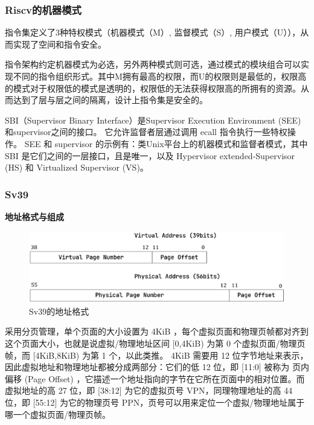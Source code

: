 \subsubsection{Riscv的机器模式}

指令集定义了3种特权模式（机器模式（M）, 监督模式（S）, 用户模式（U）），从而实现了空间和指令安全。

指令架构约定机器模式为必选，另外两种模式则可选，通过模式的模块组合可以实现不同的指令组织形式。其中M拥有最高的权限，而U的权限则是最低的，权限高的模式对于权限低的模式是透明的，权限低的无法获得权限高的所拥有的资源。从而达到了层与层之间的隔离，设计上指令集是安全的。

SBI（Supervisor Binary Interface）是Supervisor Execution Environment (SEE)和supervisor之间的接口。 它允许监督者层通过调用 ecall 指令执行一些特权操作。 SEE 和 supervisor 的示例有：类Unix平台上的机器模式和监督者模式，其中 SBI 是它们之间的一层接口，且是唯一，以及 Hypervisor extended-Supervisor (HS) 和 Virtualized Supervisor (VS)。

\subsubsection{Sv39}

\textbf{地址格式与组成}

\begin{figure}[htb]
    \figureCapSet
    \centering
    \includegraphics[width=.8\linewidth]{figure/c2/addressstructure.png}
    \caption{Sv39的地址格式}
    \label{figure:c2addressstructure}
\end{figure}

采用分页管理，单个页面的大小设置为 4KiB ，每个虚拟页面和物理页帧都对齐到这个页面大小，也就是说虚拟/物理地址区间 [0,4KiB) 为第 0 个虚拟页面/物理页帧，而 [4KiB,8KiB) 为第 1 个，以此类推。 4KiB 需要用 12 位字节地址来表示，因此虚拟地址和物理地址都被分成两部分：它们的低 12 位，即 [11:0] 被称为 页内偏移 (Page Offset) ，它描述一个地址指向的字节在它所在页面中的相对位置。而虚拟地址的高 27 位，即 [38:12] 为它的虚拟页号 VPN，同理物理地址的高 44 位，即 [55:12] 为它的物理页号 PPN，页号可以用来定位一个虚拟/物理地址属于哪一个虚拟页面/物理页帧。

